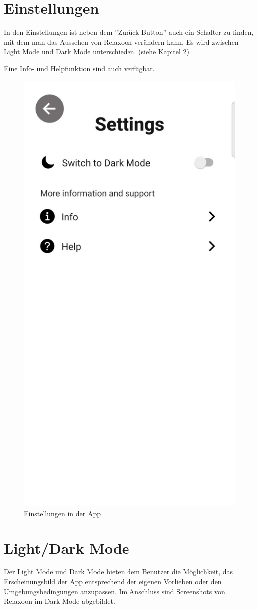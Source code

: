 \newpage

\section{Einstellungen}\label{chapter:einstellungen}

In den Einstellungen ist neben dem ''Zurück-Button'' auch ein Schalter zu finden, mit dem man das Aussehen von Relaxoon
verändern kann. Es wird zwischen Light Mode und Dark Mode unterschieden. (siehe Kapitel \ref{chapter:modes})

Eine Info- und Helpfunktion sind auch verfügbar.

\begin{figure}[H]
    \centering
    \includegraphics[height=\textwidth]{./pics/Settings.jpg}
    \caption{Einstellungen in der App}
\end{figure}

\newpage

\section{Light/Dark Mode}\label{chapter:modes}

Der Light Mode und Dark Mode bieten dem Benutzer die Möglichkeit, das Erscheinungsbild der App entsprechend der eigenen
Vorlieben oder den Umgebungsbedingungen anzupassen. Im Anschluss sind Screenshots von Relaxoon im Dark Mode abgebildet.

